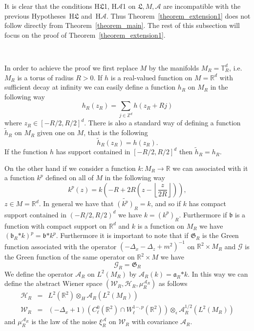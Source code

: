 \documentclass[a4paper,10pt]{article}
\newcommand{\asterisk}{\mathord{*}}
\begin{document}
It is clear that the conditions H$\mathfrak{L}$1, H$\mathcal{A}$1 on
$\mathfrak{L}, M, \mathcal{A}$ are incompatible with the previous
Hypotheses~H$\mathfrak{L}$ and~H$\mathcal{A}$. Thus
Theorem~\ref{theorem_extension1} does not follow directly from
Theorem~\ref{theorem_main}. The rest of this subsection will focus on the
proof of Theorem~\ref{theorem_extension1}.

\

In order to achieve the proof we first replace $M$ by the manifolds $M_R
=\mathbb{T}^d_R$, i.e. $M_R$ is a torus of radius $R > 0$. If $h$ is a
real-valued function on $M =\mathbb{R}^d$ with sufficient decay at infinity we
can easily define a function $h_R$ on $M_R$ in the following way
\[ h_R (z_R) = \sum_{j \in \mathbb{Z}^d} h (z_R + R j) \]
where $z_R \in [- R / 2, R / 2]^d$. There is also a standard way of defining a
function $\tilde{h}_R$ on $M_R$ given one on $M$, that is the following
\[ \tilde{h}_R (z_R) = h (z_R) . \]
If the function $h$ has support contained in $[- R / 2, R / 2]^d$ then
$\tilde{h}_R = h_R$.

On the other hand if we consider a function $k : M_R \rightarrow \mathbb{R}$
we can associated with it a function $k^p$ defined on all of $M$ in the
following way
\[ k^p (z) = k \left( - R + 2 R \left( z - \left\lfloor \frac{z}{2 R}
   \right\rfloor \right) \right), \]
$z \in M =\mathbb{R}^d$. In general we have that $\widetilde{(k^p)}_R = k$,
and so if $k$ has compact support contained in $(- R / 2, R / 2)^d$ we have $k
= (k^p)_R$. Furthermore if $\mathfrak{b}$ is a function with compact support
on $\mathbb{R}^d$ and $k$ is a function on $M_R$ we have $(\mathfrak{b}_R
\asterisk k)^p = \mathfrak{b} \asterisk k^p$. Furthermore it is important to
note that if $\mathfrak{G}_R$ is the Green function associated with the
operator $(- \Delta_x - \Delta_z + m^2)^{- 1}$ on $\mathbb{R}^2 \times M_R$
and $\mathcal{G}$ is the Green function of the same operator on $\mathbb{R}^2
\times M$ we have
\[ \mathcal{G}_R = \mathfrak{G}_R \]
We define the operator $\mathcal{A}_R$ on $L^2 (M_R)$ by $\mathcal{A}_R (k) =
\mathfrak{a}_R \asterisk k$. In this way we can define the abstract Wiener
space $(\mathcal{W}_R, \mathcal{H}_R, \mu^{\mathcal{A}_R}_R)$ as follows
\begin{eqnarray}
  \mathcal{H}_R & = & L^2 (\mathbb{R}^2) \otimes_H \mathcal{A}_R (L^2 (M_R))
  \nonumber\\
  \mathcal{W}_R & = & (- \Delta_x + 1) (C^0_{\ell} (\mathbb{R}^2) \cap W^{1 -,
  p}_{\ell} (\mathbb{R}^2)) \otimes_{\epsilon} \mathcal{A}_R^{1 / 2} (L^2
  (M_R)) \nonumber
\end{eqnarray}
and $\mu^{\mathcal{A}_R}_R$ is the law of the noise $\xi^{\mathcal{A}}_R$ on
$\mathcal{W}_R$ with covariance $\mathcal{A}_R$.
\end{document}
